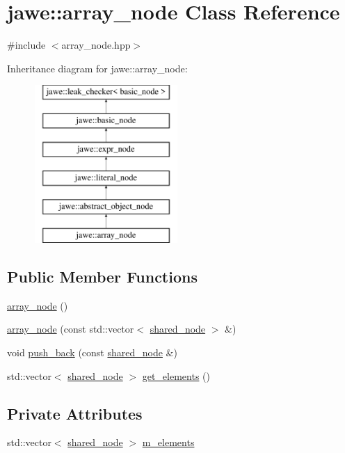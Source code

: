 \hypertarget{classjawe_1_1array__node}{}\section{jawe\+:\+:array\+\_\+node Class Reference}
\label{classjawe_1_1array__node}


{\ttfamily \#include $<$array\+\_\+node.\+hpp$>$}

Inheritance diagram for jawe\+:\+:array\+\_\+node\+:\begin{figure}[H]
\begin{center}
\leavevmode
\includegraphics[height=6.000000cm]{classjawe_1_1array__node}
\end{center}
\end{figure}
\subsection*{Public Member Functions}
\begin{DoxyCompactItemize}
\item 
\hyperlink{classjawe_1_1array__node_ad9312ef54ed8588abf01fb6400201f04}{array\+\_\+node} ()
\item 
\hyperlink{classjawe_1_1array__node_af7f4791dfb0271ec0cce77c819069d84}{array\+\_\+node} (const std\+::vector$<$ \hyperlink{namespacejawe_a3f307481d921b6cbb50cc8511fc2b544}{shared\+\_\+node} $>$ \&)
\item 
void \hyperlink{classjawe_1_1array__node_af7c5ff9f67cb6601195cbc738c097239}{push\+\_\+back} (const \hyperlink{namespacejawe_a3f307481d921b6cbb50cc8511fc2b544}{shared\+\_\+node} \&)
\item 
std\+::vector$<$ \hyperlink{namespacejawe_a3f307481d921b6cbb50cc8511fc2b544}{shared\+\_\+node} $>$ \hyperlink{classjawe_1_1array__node_af83a0fd5093baee2db6e9aac615e9384}{get\+\_\+elements} ()
\end{DoxyCompactItemize}
\subsection*{Private Attributes}
\begin{DoxyCompactItemize}
\item 
std\+::vector$<$ \hyperlink{namespacejawe_a3f307481d921b6cbb50cc8511fc2b544}{shared\+\_\+node} $>$ \hyperlink{classjawe_1_1array__node_a13e0825e1f6f7334678c6f8a313532c2}{m\+\_\+elements}
\end{DoxyCompactItemize}
